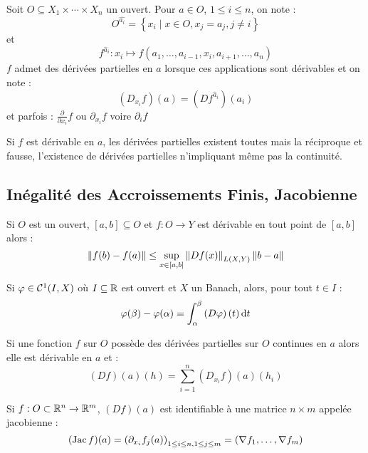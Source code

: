 \documentclass{cours}
\begin{document}
\begin{definition}
    Soit $O \subseteq X_{1} \times \cdots \times X_{n}$ un ouvert. Pour $a \in O$, $1 \leq i \leq n$, on note :
    \[
        O^{\hat{a_{i}}} = \left\{x_{i}\mid x \in O, x_{j} = a_{j}, j \neq i\right\}
    \]
    et
    \[
        f^{\hat{a}_{i}} : x_{i} \mapsto f(a_{1}, \ldots, a_{i - 1}, x_{i}, a_{i + 1}, \ldots, a_{n})
    \]
    $f$ admet des dérivées partielles en $a$ lorsque ces applications sont dérivables et on note :
    \[
        (D_{x_{i}}f)(a) = (Df^{\hat{a}_{i}})(a_{i})
    \]
    et parfois : $\frac{\partial}{\partial x_{i}}f$ ou $\partial_{x_{i}}f$ voire $\partial_{i}f$
\end{definition}

\begin{proposition}
    Si $f$ est dérivable en $a$, les dérivées partielles existent toutes mais la réciproque et fausse, l'existence de dérivées partielles n'impliquant même pas la continuité.
\end{proposition}

\subsection{Inégalité des Accroissements Finis, Jacobienne}
\begin{lemma}
    Si $O$ est un ouvert, $\left[a, b\right] \subseteq O$ et $f : O \rightarrow Y$ est dérivable en tout point de $\left[a, b\right]$ alors :
    \[
        \left\lVert f(b) - f(a) \right\rVert \leq \sup_{x \in \left[a, b \right]} \left\lVert Df(x) \right\rVert_{L(X, Y)} \left\lVert b - a \right\rVert
    \]
\end{lemma}

\begin{proposition}
    Si $\varphi \in \mathcal{C}^{1}(I, X)$ où $I \subseteq \mathbb{R}$ est ouvert et $X$ un Banach, alors, pour tout $t \in I$ :
    \[
        \varphi(\beta) - \varphi(\alpha) = \int_{\alpha}^{\beta}\left(D\varphi\right)(t){\rm \, d} t
    \]
\end{proposition}

\begin{corollary}
    Si une fonction $f$ sur $O$ possède des dérivées partielles sur $O$ continues en $a$ alors elle est dérivable en $a$ et :
    \[
        (Df)(a)(h) = \sum_{i = 1}^{n}(D_{x_{i}}f)(a)(h_{i})
    \]
\end{corollary}

\begin{definition}
    Si $f : O \subset \mathbb{R}^{n} \rightarrow \mathbb{R}^{m}$, $(Df)(a)$ est identifiable à une matrice $n \times m$ appelée jacobienne :
    \[
        (\operatorname{Jac} f)(a) = \left(\partial_{x_{i}}f_{j}(a)\right)_{1\leq i \leq n, 1\leq j\leq m} = \left(\nabla f_{1}, \ldots, \nabla f_{m}\right)
    \]
\end{definition}
\end{document}

